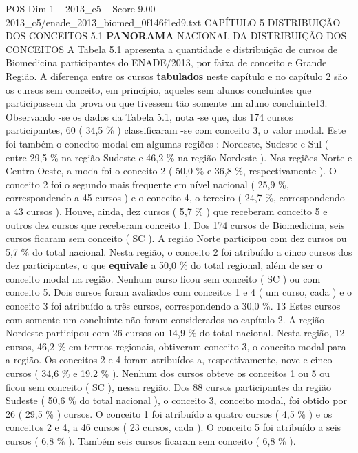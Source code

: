 \begin{textsample}{POS Dim 1 – 2013\_c5 – Score 9.00 – 2013\_c5/enade\_2013\_biomed\_0f146f1ed9.txt}  \label{ex:f1_pos_088}
CAPÍTULO 5 DISTRIBUIÇÃO DOS CONCEITOS 5.1 \textbf{PANORAMA} NACIONAL DA DISTRIBUIÇÃO DOS CONCEITOS A Tabela 5.1 apresenta a quantidade e distribuição de cursos de Biomedicina participantes do ENADE/2013, por faixa de conceito e Grande Região.
A diferença entre os cursos \textbf{tabulados} neste capítulo e no capítulo 2 são os cursos sem conceito, em princípio, aqueles sem alunos concluintes que participassem da prova ou que tivessem tão somente um aluno concluinte13.
Observando -se os dados da Tabela 5.1, nota -se que, dos 174 cursos participantes, 60 ( 34,5 \% ) classificaram -se com conceito 3, o valor modal.
Este foi também o conceito modal em algumas regiões : Nordeste, Sudeste e Sul ( entre 29,5 \% na região Sudeste e 46,2 \% na região Nordeste ).
Nas regiões Norte e Centro-Oeste, a moda foi o conceito 2 ( 50,0 \% e 36,8 \%, respectivamente ).
O conceito 2 foi o segundo mais frequente em nível nacional ( 25,9 \%, correspondendo a 45 cursos ) e o conceito 4, o terceiro ( 24,7 \%, correspondendo a 43 cursos ).
Houve, ainda, dez cursos ( 5,7 \% ) que receberam conceito 5 e outros dez cursos que receberam conceito 1.
Dos 174 cursos de Biomedicina, seis cursos ficaram sem conceito ( SC ).
A região Norte participou com dez cursos ou 5,7 \% do total nacional.
Nesta região, o conceito 2 foi atribuído a cinco cursos dos dez participantes, o que \textbf{equivale} a 50,0 \% do total regional, além de ser o conceito modal na região.
Nenhum curso ficou sem conceito ( SC ) ou com conceito 5.
Dois cursos foram avaliados com conceitos 1 e 4 ( um curso, cada ) e o conceito 3 foi atribuído a três cursos, correspondendo a 30,0 \%. 13 Estes cursos com somente um concluinte não foram considerados no capítulo 2.
A região Nordeste participou com 26 cursos ou 14,9 \% do total nacional.
Nesta região, 12 cursos, 46,2 \% em termos regionais, obtiveram conceito 3, o conceito modal para a região.
Os conceitos 2 e 4 foram atribuídos a, respectivamente, nove e cinco cursos ( 34,6 \% e 19,2 \% ).
Nenhum dos cursos obteve os conceitos 1 ou 5 ou ficou sem conceito ( SC ), nessa região.
Dos 88 cursos participantes da região Sudeste ( 50,6 \% do total nacional ), o conceito 3, conceito modal, foi obtido por 26 ( 29,5 \% ) cursos.
O conceito 1 foi atribuído a quatro cursos ( 4,5 \% ) e os conceitos 2 e 4, a 46 cursos ( 23 cursos, cada ).
O conceito 5 foi atribuído a seis cursos ( 6,8 \% ).
Também seis cursos ficaram sem conceito ( 6,8 \% ).

\end{textsample}
